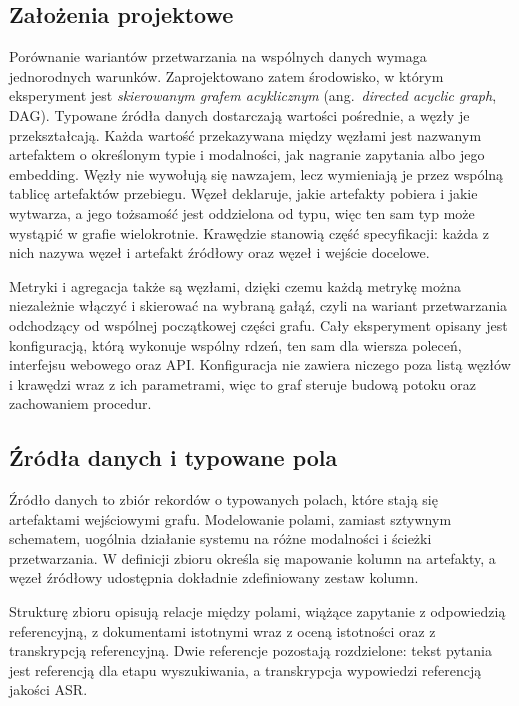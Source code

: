 \subsection{Założenia projektowe}
Porównanie wariantów przetwarzania na wspólnych danych wymaga jednorodnych warunków.
Zaprojektowano zatem środowisko, w którym
eksperyment jest \textit{skierowanym grafem acyklicznym} (ang.\ \textit{directed acyclic graph},
DAG). Typowane źródła danych dostarczają wartości pośrednie, a węzły je przekształcają. Każda
wartość przekazywana między węzłami jest nazwanym artefaktem o określonym typie i modalności, jak
nagranie zapytania albo jego embedding. Węzły nie wywołują się nawzajem, lecz wymieniają
je przez wspólną tablicę artefaktów przebiegu. Węzeł deklaruje, jakie artefakty pobiera i
jakie wytwarza, a jego tożsamość jest oddzielona od typu, więc ten sam typ może wystąpić w grafie
wielokrotnie. Krawędzie stanowią część specyfikacji: każda z nich nazywa węzeł i artefakt
źródłowy oraz węzeł i wejście docelowe.

Metryki i agregacja także są węzłami, dzięki czemu każdą metrykę można niezależnie włączyć i
skierować na wybraną gałąź, czyli na wariant przetwarzania odchodzący od wspólnej początkowej
części grafu. Cały eksperyment opisany jest konfiguracją, którą wykonuje wspólny rdzeń, ten sam
dla wiersza poleceń, interfejsu webowego oraz API. Konfiguracja nie
zawiera niczego poza listą węzłów i krawędzi wraz z ich parametrami, więc to graf steruje budową
potoku oraz zachowaniem procedur.

\subsection{Źródła danych i typowane pola}
Źródło danych to zbiór rekordów o typowanych polach, które stają się artefaktami wejściowymi
grafu. Modelowanie polami, zamiast sztywnym schematem, uogólnia działanie systemu na różne modalności
i ścieżki przetwarzania. W definicji zbioru określa się mapowanie kolumn na artefakty, a węzeł
źródłowy udostępnia dokładnie zdefiniowany zestaw kolumn.

Strukturę zbioru opisują relacje między polami, wiążące zapytanie z odpowiedzią referencyjną, z
dokumentami istotnymi wraz z oceną istotności oraz z transkrypcją referencyjną. Dwie referencje
pozostają rozdzielone: tekst pytania jest referencją dla etapu wyszukiwania, a transkrypcja
wypowiedzi referencją jakości ASR.

